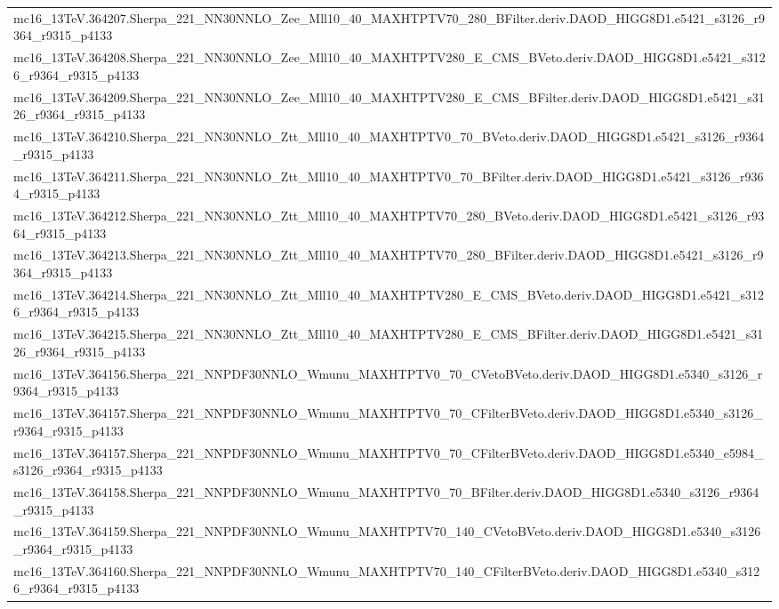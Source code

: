 \begin{adjustwidth}{-3em}{-3em}
\begin{longtable}{l}
mc16\_13TeV.364207.Sherpa\_221\_NN30NNLO\_Zee\_Mll10\_40\_MAXHTPTV70\_280\_BFilter.deriv.DAOD\_HIGG8D1.e5421\_s3126\_r9364\_r9315\_p4133 \\
mc16\_13TeV.364208.Sherpa\_221\_NN30NNLO\_Zee\_Mll10\_40\_MAXHTPTV280\_E\_CMS\_BVeto.deriv.DAOD\_HIGG8D1.e5421\_s3126\_r9364\_r9315\_p4133 \\
mc16\_13TeV.364209.Sherpa\_221\_NN30NNLO\_Zee\_Mll10\_40\_MAXHTPTV280\_E\_CMS\_BFilter.deriv.DAOD\_HIGG8D1.e5421\_s3126\_r9364\_r9315\_p4133 \\
mc16\_13TeV.364210.Sherpa\_221\_NN30NNLO\_Ztt\_Mll10\_40\_MAXHTPTV0\_70\_BVeto.deriv.DAOD\_HIGG8D1.e5421\_s3126\_r9364\_r9315\_p4133 \\
mc16\_13TeV.364211.Sherpa\_221\_NN30NNLO\_Ztt\_Mll10\_40\_MAXHTPTV0\_70\_BFilter.deriv.DAOD\_HIGG8D1.e5421\_s3126\_r9364\_r9315\_p4133 \\
mc16\_13TeV.364212.Sherpa\_221\_NN30NNLO\_Ztt\_Mll10\_40\_MAXHTPTV70\_280\_BVeto.deriv.DAOD\_HIGG8D1.e5421\_s3126\_r9364\_r9315\_p4133 \\
mc16\_13TeV.364213.Sherpa\_221\_NN30NNLO\_Ztt\_Mll10\_40\_MAXHTPTV70\_280\_BFilter.deriv.DAOD\_HIGG8D1.e5421\_s3126\_r9364\_r9315\_p4133 \\
mc16\_13TeV.364214.Sherpa\_221\_NN30NNLO\_Ztt\_Mll10\_40\_MAXHTPTV280\_E\_CMS\_BVeto.deriv.DAOD\_HIGG8D1.e5421\_s3126\_r9364\_r9315\_p4133 \\
mc16\_13TeV.364215.Sherpa\_221\_NN30NNLO\_Ztt\_Mll10\_40\_MAXHTPTV280\_E\_CMS\_BFilter.deriv.DAOD\_HIGG8D1.e5421\_s3126\_r9364\_r9315\_p4133 \\
mc16\_13TeV.364156.Sherpa\_221\_NNPDF30NNLO\_Wmunu\_MAXHTPTV0\_70\_CVetoBVeto.deriv.DAOD\_HIGG8D1.e5340\_s3126\_r9364\_r9315\_p4133 \\
mc16\_13TeV.364157.Sherpa\_221\_NNPDF30NNLO\_Wmunu\_MAXHTPTV0\_70\_CFilterBVeto.deriv.DAOD\_HIGG8D1.e5340\_s3126\_r9364\_r9315\_p4133 \\
mc16\_13TeV.364157.Sherpa\_221\_NNPDF30NNLO\_Wmunu\_MAXHTPTV0\_70\_CFilterBVeto.deriv.DAOD\_HIGG8D1.e5340\_e5984\_s3126\_r9364\_r9315\_p4133 \\
mc16\_13TeV.364158.Sherpa\_221\_NNPDF30NNLO\_Wmunu\_MAXHTPTV0\_70\_BFilter.deriv.DAOD\_HIGG8D1.e5340\_s3126\_r9364\_r9315\_p4133 \\
mc16\_13TeV.364159.Sherpa\_221\_NNPDF30NNLO\_Wmunu\_MAXHTPTV70\_140\_CVetoBVeto.deriv.DAOD\_HIGG8D1.e5340\_s3126\_r9364\_r9315\_p4133 \\
mc16\_13TeV.364160.Sherpa\_221\_NNPDF30NNLO\_Wmunu\_MAXHTPTV70\_140\_CFilterBVeto.deriv.DAOD\_HIGG8D1.e5340\_s3126\_r9364\_r9315\_p4133 \\

\end{longtable}
\end{adjustwidth}
